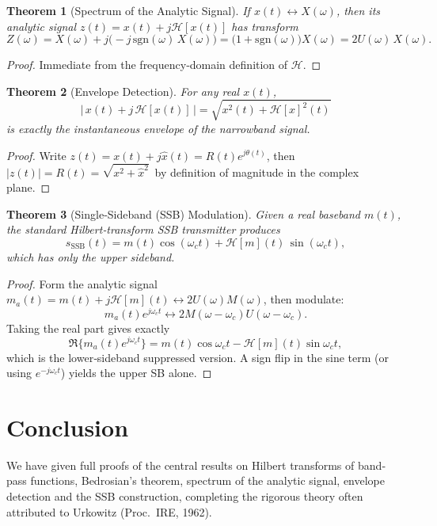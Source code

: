 \documentclass[12pt]{article}
\theoremstyle{plain}
\newtheorem{theorem}{Theorem}[section]
\theoremstyle{definition}
\theoremstyle{remark}
\begin{document}
\begin{theorem}[Spectrum of the Analytic Signal]
\label{thm:spectrum}
If $x(t)\leftrightarrow X(\omega)$, then its analytic signal
$z(t)=x(t)+j\mathcal{H}[x(t)]$ has transform
\[
Z(\omega)
= X(\omega)+j\bigl(-j\,\mathrm{sgn}(\omega)\,X(\omega)\bigr)
= \bigl(1+\mathrm{sgn}(\omega)\bigr)X(\omega)
= 2U(\omega)\,X(\omega).
\]
\end{theorem}

\begin{proof}
Immediate from the frequency‐domain definition of $\mathcal{H}$.
\end{proof}

\begin{theorem}[Envelope Detection]
\label{thm:envelope}
For any real $x(t)$,
\[
|\,x(t)+j\,\mathcal{H}[x(t)]\,|
=\sqrt{x^2(t)+\mathcal{H}[x]^2(t)}
\]
is exactly the instantaneous envelope of the narrowband signal.
\end{theorem}

\begin{proof}
Write $z(t)=x(t)+j\widehat{x}(t)=R(t)e^{j\theta(t)}$, then
$|z(t)|=R(t)=\sqrt{x^2+\widehat{x}^2}\,$ by definition of magnitude in the complex plane.
\end{proof}

\begin{theorem}[Single‐Sideband (SSB) Modulation]
\label{thm:ssb}
Given a real baseband $m(t)$, the standard Hilbert‐transform SSB transmitter
produces
\[
s_{\mathrm{SSB}}(t)
= m(t)\cos(\omega_c t)
+ \mathcal{H}[m](t)\,\sin(\omega_c t),
\]
which has only the upper sideband.
\end{theorem}

\begin{proof}
Form the analytic signal $m_a(t)=m(t)+j\mathcal{H}[m](t)\leftrightarrow2U(\omega)M(\omega)$,
then modulate:
\[
m_a(t)e^{j\omega_ct}
\leftrightarrow 2M(\omega-\omega_c)U(\omega-\omega_c).
\]
Taking the real part gives exactly
\[
\Re\{m_a(t)e^{j\omega_ct}\}
= m(t)\cos\omega_ct - \mathcal{H}[m](t)\sin\omega_ct,
\]
which is the lower‐sideband suppressed version.  A sign flip in the sine term
(or using $e^{-j\omega_ct}$) yields the upper SB alone.
\end{proof}

\section{Conclusion}
We have given full proofs of the central results on Hilbert transforms
of band‐pass functions, Bedrosian’s theorem, spectrum of the analytic signal,
envelope detection and the SSB construction, completing the rigorous
theory often attributed to Urkowitz (Proc.\ IRE, 1962).
\end{document}
